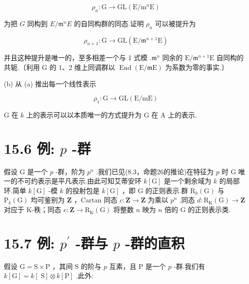 \documentclass[10pt]{article}
\begin{document}
\[
{\rho }_{n} : \mathrm{G} \rightarrow  \mathrm{{GL}}\left( {\mathrm{E}/{\mathrm{m}}^{n}\mathrm{E}}\right)
\]

为把 \(G\) 同构到 \(E/{\mathfrak{m}}^{n}E\) 的自同构群的同态.证明 \({\rho }_{n}\) 可以被提升为

\[
{\rho }_{n + 1} : \mathrm{G} \rightarrow  \mathrm{{GL}}\left( {\mathrm{E}/{\mathfrak{m}}^{n + 1}\mathrm{E}}\right)
\]

并且这种提升是唯一的，至多相差一个与 1 式模 \(.{\mathfrak{m}}^{n}\) 同余的 \(\mathrm{E}/{\mathfrak{m}}^{n + 1}\mathrm{E}\) 自同构的共轭.〔利用 \(\mathrm{G}\) 的 1、2 维上同调群以 \(\operatorname{End}\left( {\mathrm{E}/\mathfrak{m}\mathrm{E}}\right)\) 为系数为零的事实.〕

(b) 从 (a) 推出每一个线性表示

\[
{\rho }_{1} : \mathrm{G} \rightarrow  \mathrm{{GL}}\left( {\mathrm{E}/\mathrm{{mE}}}\right)
\]

G 在 \(k\) 上的表示可以以本质唯一的方式提升为 G 在 A 上的表示.

\section*{15.6 例: \(p\) -群}

假设 \(\mathrm{G}\) 是一个 \(p\) -群，阶为 \({p}^{n}\) .我们已见(8.3，命题26的推论)在特征为 \(p\) 时 \(\mathrm{G}\) 唯一的不可约表示是平凡表示.由此可知艾蒂安环 \(k\left\lbrack  \mathrm{G}\right\rbrack\) 是一个剩余域为 \(k\) 的局部环.简单 \(k\left\lbrack  \mathrm{G}\right\rbrack\) -模 \(k\) 的投射包是 \(k\left\lbrack  \mathrm{G}\right\rbrack\) ，即 \(\mathrm{G}\) 的正则表示.群 \({\mathrm{R}}_{k}\left( \mathrm{G}\right)\) 与 \({\mathrm{P}}_{k}\left( \mathrm{G}\right)\) 均可鉴别为 \(\mathbf{Z}\) ，Cartan 同态 \(c : \mathbf{Z} \rightarrow  \mathbf{Z}\) 为乘以 \({p}^{n}\) .同态 \(d : {\mathrm{R}}_{\mathrm{K}}\left( \mathrm{G}\right)  \rightarrow  \mathbf{Z}\) 对应于 K-秩；同态 \(e : \mathbf{Z} \rightarrow  {\mathrm{R}}_{\mathrm{K}}\left( \mathrm{G}\right)\) 将整数 \(n\) 映为 \(n\) 倍的 \(\mathrm{G}\) 的正则表示类.

\section*{15.7 例: \({p}^{\prime }\) -群与 \(p\) -群的直积}

假设 \(\mathrm{G} = \mathrm{S} \times  \mathrm{P}\) ，其间 \(\mathrm{S}\) 的阶与 \(p\) 互素，且 \(\mathrm{P}\) 是一个 \(p\) -群.我们有 \(k\left\lbrack  \mathrm{G}\right\rbrack   = k\left\lbrack  \mathrm{\;S}\right\rbrack   \otimes  k\left\lbrack  \mathrm{P}\right\rbrack\) .此外:
\end{document}
